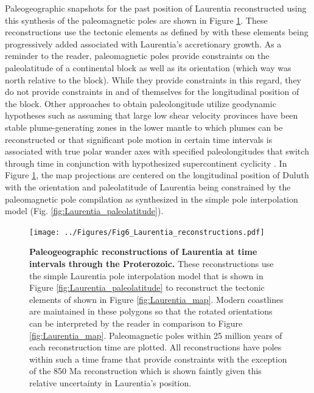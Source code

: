 \documentclass[twocolumn, switch]{article} %
\begin{document}
Paleogeographic snapshots for the past position of Laurentia reconstructed using this synthesis of the paleomagnetic poles are shown in Figure \ref{fig:Laurentia_reconstructions}. These reconstructions use the tectonic elements as defined by \citet{Whitmeyer2007a} with these elements being progressively added associated with Laurentia's accretionary growth. As a reminder to the reader, paleomagnetic poles provide constraints on the paleolatitude of a continental block as well as its orientation (which way was north relative to the block). While they provide constraints in this regard, they do not provide constraints in and of themselves for the longitudinal position of the block. Other approaches to obtain paleolongitude utilize geodynamic hypotheses such as assuming that large low shear velocity provinces have been stable plume-generating zones in the lower mantle to which plumes can be reconstructed \citep{Torsvik2014a} or that significant pole motion in certain time intervals is associated with true polar wander axes with specified paleolongitudes that switch through time in conjunction with hypothesized supercontinent cyclicity \citep{Mitchell2012a}. In Figure \ref{fig:Laurentia_reconstructions}, the map projections are centered on the longitudinal position of Duluth with the orientation and paleolatitude of Laurentia being constrained by the paleomagnetic pole compilation as synthesized in the simple pole interpolation model (Fig. \ref{fig:Laurentia_paleolatitude}).

\begin{figure}
\centering
\texttt{[image: ../Figures/Fig6\_Laurentia\_reconstructions.pdf]}
\caption{\textbf{Paleogeographic reconstructions of Laurentia at time intervals through the Proterozoic.} These reconstructions use the simple Laurentia pole interpolation model that is shown in Figure \ref{fig:Laurentia_paleolatitude} to reconstruct the tectonic elements of \cite{Whitmeyer2007a} shown in Figure \ref{fig:Laurentia_map}. Modern coastlines are maintained in these polygons so that the rotated orientations can be interpreted by the reader in comparison to Figure \ref{fig:Laurentia_map}. Paleomagnetic poles within 25 million years of each reconstruction time are plotted. All reconstructions have poles within such a time frame that provide constraints with the exception of the 850 Ma reconstruction which is shown faintly given this relative uncertainty in Laurentia's position.}
\label{fig:Laurentia_reconstructions}
\end{figure}
\end{document}
